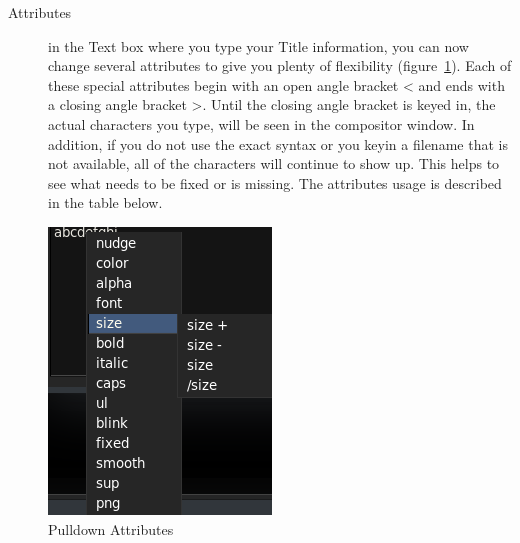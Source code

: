 \begin{description}
    \item[Attributes] in the Text box where you type your Title information, you can now change several attributes to give you plenty of flexibility (figure~\ref{fig:title02}). Each of these special attributes begin with an open angle bracket < and ends with a closing angle bracket >. Until the closing angle bracket is keyed in, the actual characters you type, will be seen in the compositor window. In addition, if you do not use the exact syntax or you keyin a filename that is not available, all of the characters will continue to show up. This helps to see what needs to be fixed or is missing. The attributes usage is described in the table below.
\end{description}

\begin{figure}[hbtp]
    \centering
    \includegraphics[width=0.3\linewidth]{images/title02.png}
    \caption{Pulldown Attributes}
    \label{fig:title02}
\end{figure}

